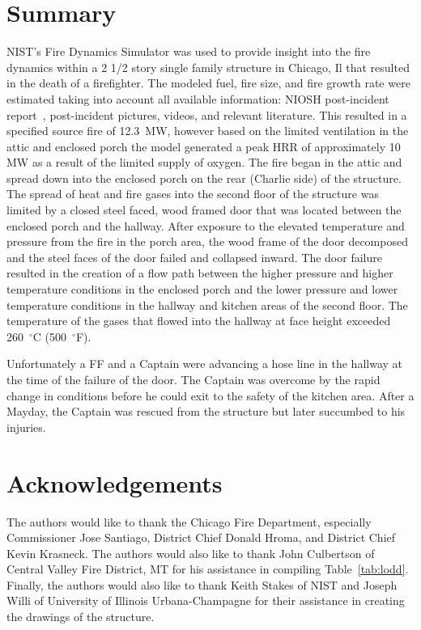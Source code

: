 \documentclass[11pt,oneside]{book}
\begin{document}
\chapter{Summary}
NIST's Fire Dynamics Simulator was used to provide insight into the fire dynamics within a 2 1/2 story single family structure in Chicago, Il that resulted in the death of a firefighter. The modeled fuel, fire size, and fire growth rate were estimated taking into account all available information: NIOSH post-incident report~\cite{NIOSH:Bowyer}, post-incident pictures, videos, and relevant literature. This resulted in a specified source fire of 12.3~MW, however based on the limited ventilation in the attic and enclosed porch the model generated a peak HRR of approximately 10 MW as a result of the limited supply of oxygen.  The fire began in the attic and spread down into the enclosed porch on the rear (Charlie side) of the structure.  The spread of heat and fire gases into the second floor of the structure was limited by a closed steel faced, wood framed door that was located between the enclosed porch and the hallway.  After exposure to the elevated temperature and pressure from the fire in the porch area, the wood frame of the door decomposed and the steel faces of the door failed and collapsed inward.  The door failure resulted in the creation of a flow path between the higher pressure and higher temperature conditions in the enclosed porch and the lower pressure and lower temperature conditions in the hallway and kitchen areas of the second floor.  The temperature of the gases that flowed into the hallway at face height exceeded 260~$^{\circ}$C (500~$^{\circ}$F). 

Unfortunately a FF and a Captain were advancing a hose line in the hallway at the time of the failure of the door.  The Captain was overcome by the rapid change in conditions before he could exit to the safety of the kitchen area.  After a Mayday, the Captain was rescued from the structure but later succumbed to his injuries.


\chapter{Acknowledgements}
The authors would like to thank the Chicago Fire Department, especially Commissioner Jose Santiago, District Chief Donald Hroma, and District Chief Kevin Krasneck. The authors would also like to thank John Culbertson of Central Valley Fire District, MT for his assistance in compiling Table~\ref{tab:lodd}. Finally, the authors would also like to thank Keith Stakes of NIST and Joseph Willi of University of Illinois Urbana-Champagne for their assistance in creating the drawings of the structure.
\end{document}
